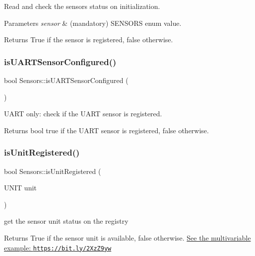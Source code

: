 Read and check the sensors status on initialization. 


\begin{DoxyParams}{Parameters}
{\em sensor} & (mandatory) S\+E\+N\+S\+O\+RS enum value. \\
\hline
\end{DoxyParams}
\begin{DoxyReturn}{Returns}
True if the sensor is registered, false otherwise. 
\end{DoxyReturn}
\mbox{\label{classSensors_aa99811f9bb9778253e4d0476fab7b86c}} 
\subsubsection{\texorpdfstring{is\+U\+A\+R\+T\+Sensor\+Configured()}{isUARTSensorConfigured()}}
{\footnotesize\ttfamily bool Sensors\+::is\+U\+A\+R\+T\+Sensor\+Configured (\begin{DoxyParamCaption}{ }\end{DoxyParamCaption})}



U\+A\+RT only\+: check if the U\+A\+RT sensor is registered. 

\begin{DoxyReturn}{Returns}
bool true if the U\+A\+RT sensor is registered, false otherwise. 
\end{DoxyReturn}
\mbox{\label{classSensors_ac1acd7bf32bda39fdfde1753af3ceef2}} 
\subsubsection{\texorpdfstring{is\+Unit\+Registered()}{isUnitRegistered()}}
{\footnotesize\ttfamily bool Sensors\+::is\+Unit\+Registered (\begin{DoxyParamCaption}\item[{U\+N\+IT}]{unit }\end{DoxyParamCaption})}



get the sensor unit status on the registry 

\begin{DoxyReturn}{Returns}
True if the sensor unit is available, false otherwise. \hyperlink{}{See the multivariable example\+: \href{https://bit.ly/2XzZ9yw}{\tt https\+://bit.\+ly/2\+Xz\+Z9yw} }
\end{DoxyReturn}
\mbox{\label{classSensors_aed05af978baed0801ff4de5f1c367cf0}} 
